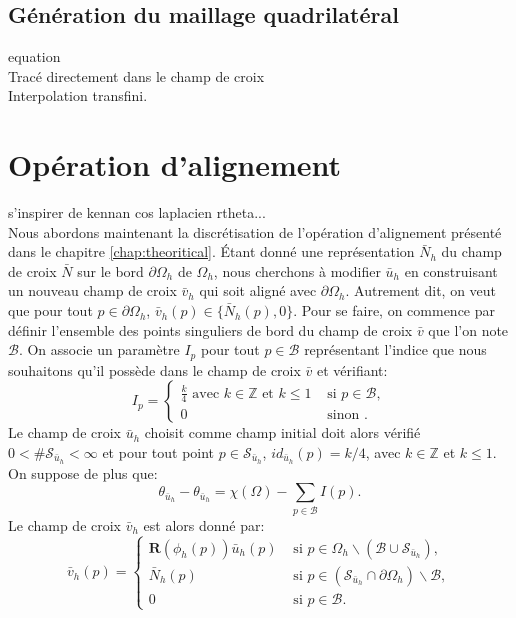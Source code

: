 \subsection{Génération du maillage quadrilatéral}
\label{subsec:gen_mesh_quad}

equation\\
Tracé directement dans le champ de croix\\
Interpolation transfini.

\section{Opération d'alignement}
s'inspirer de kennan cos laplacien rtheta...
\[\]
Nous abordons maintenant la discrétisation de l'opération d'alignement présenté dans le chapitre \ref{chap:theoritical}. Étant donné une représentation $\bar{N}_h$ du champ de croix $\bar{N}$ sur le bord $\partial\Omega_h$ de $\Omega_h$, nous cherchons à modifier $\bar{u}_h$ en construisant un nouveau champ de croix $\bar{v}_h$ qui soit aligné avec $\partial\Omega_h$. Autrement dit, on veut que pour tout $p\in\partial\Omega_h$, $\bar{v}_h(p)\in\{\bar{N}_h(p), 0\}$. Pour se faire, on commence par définir l'ensemble des points singuliers de bord du champ de croix $\bar{v}$ que l'on note $\mathcal{B}$. On associe un paramètre $I_p$ pour tout $p\in\mathcal{B}$ représentant l'indice que nous souhaitons qu'il possède dans le champ de croix $\bar{v}$ et vérifiant:
\begin{equation}
I_p=
\left\{
\begin{array}{ll}
\displaystyle\frac{k}{4}\mbox{ avec }k\in\mathbb{Z}\mbox{ et }k\leq 1&\mbox{ si }p\in\mathcal{B},\\[0.5cm]
0&\mbox{ sinon }.
\end{array}
\right.
\end{equation}
Le champ de croix $\bar{u}_h$ choisit comme champ initial doit alors vérifié $0<\#\mathcal{S}_{\bar{u}_h}<\infty$ et pour tout point $p\in\mathcal{S}_{\bar{u}_h}$, $id_{\bar{u}_h}(p)=k/4$, avec $k\in\mathbb{Z}$ et $k\leq 1$. On suppose de plus que:
\begin{equation}
    \label{eqn:etude_hyp_u_simple}
    \theta_{\bar{u}_h}-\theta_{\bar{u}_h}=\chi(\Omega)-\sum_{p\in\mathcal{B}}I(p).
\end{equation}
Le champ de croix $\bar{v}_h$ est alors donné par:
\begin{equation}
\bar{v}_h(p)=
\left\{
\begin{array}{ll}
\mathbf{R}(\phi_h(p))\bar{u}_h(p) & \mbox{ si } p\in\Omega_h\backslash(\mathcal{B}\cup\mathcal{S}_{\bar{u}_h}),\\[0.5cm]
\bar{N}_h(p) & \mbox{ si } p\in(\mathcal{S}_{\bar{u}_h}\cap\partial\Omega_h)\backslash\mathcal{B},\\[0.5cm]
0 & \mbox{ si } p\in\mathcal{B}.
\end{array}
\right.
\label{eqn:etude_def_v_second}
\end{equation}
